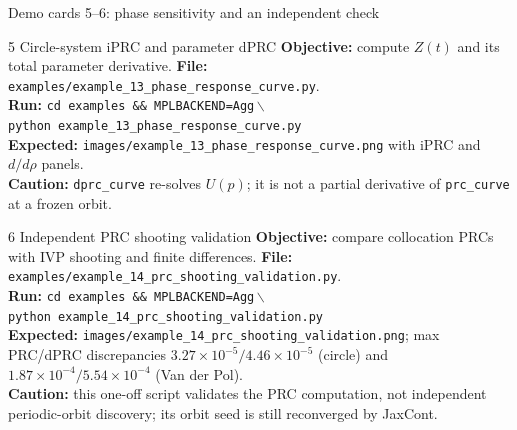 \begin{frame}{Demo cards 5--6: phase sensitivity and an independent check}
\scriptsize
\begin{block}{5 \quad Circle-system iPRC and parameter dPRC \quad \mainbadge}
\textbf{Objective:} compute $Z(t)$ and its total parameter derivative.\quad
\textbf{File:} \texttt{examples/example\_13\_phase\_response\_curve.py}.\\
\textbf{Run:} \texttt{cd examples \&\& MPLBACKEND=Agg}\,$\backslash$\\
\hspace*{8mm}\texttt{python example\_13\_phase\_response\_curve.py}\\
\textbf{Expected:} \texttt{images/example\_13\_phase\_response\_curve.png}
with iPRC and $d/d\rho$ panels.\\
\textbf{Caution:} \texttt{dprc\_curve} re-solves $U(p)$; it is not a partial
derivative of \texttt{prc\_curve} at a frozen orbit.
\end{block}

\begin{block}{6 \quad Independent PRC shooting validation \quad \mainbadge}
\textbf{Objective:} compare collocation PRCs with IVP shooting and finite differences.\quad
\textbf{File:} \texttt{examples/example\_14\_prc\_shooting\_validation.py}.\\
\textbf{Run:} \texttt{cd examples \&\& MPLBACKEND=Agg}\,$\backslash$\\
\hspace*{8mm}\texttt{python example\_14\_prc\_shooting\_validation.py}\\
\textbf{Expected:} \texttt{images/example\_14\_prc\_shooting\_validation.png};
max PRC/dPRC discrepancies $3.27\times10^{-5}/4.46\times10^{-5}$ (circle)
and $1.87\times10^{-4}/5.54\times10^{-4}$ (Van der Pol).\\
\textbf{Caution:} this one-off script validates the PRC computation, not
independent periodic-orbit discovery; its orbit seed is still reconverged by JaxCont.
\end{block}
\end{frame}

